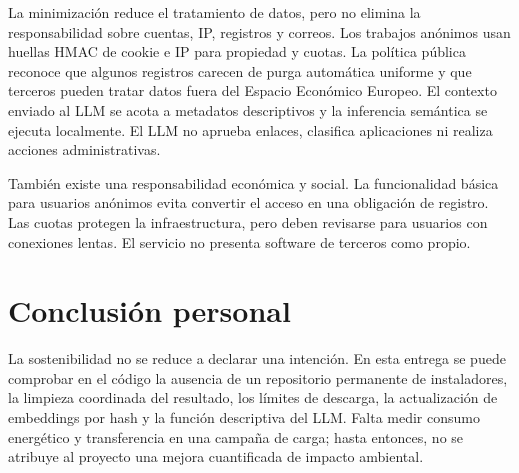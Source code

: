 La minimización reduce el tratamiento de datos, pero no elimina la responsabilidad sobre cuentas, IP, registros y correos. Los trabajos anónimos usan huellas HMAC de cookie e IP para propiedad y cuotas. La política pública reconoce que algunos registros carecen de purga automática uniforme y que terceros pueden tratar datos fuera del Espacio Económico Europeo. El contexto enviado al LLM se acota a metadatos descriptivos y la inferencia semántica se ejecuta localmente. El LLM no aprueba enlaces, clasifica aplicaciones ni realiza acciones administrativas.

También existe una responsabilidad económica y social. La funcionalidad básica para usuarios anónimos evita convertir el acceso en una obligación de registro. Las cuotas protegen la infraestructura, pero deben revisarse para usuarios con conexiones lentas. El servicio no presenta software de terceros como propio.

\section{Conclusión personal}

La sostenibilidad no se reduce a declarar una intención. En esta entrega se puede comprobar en el código la ausencia de un repositorio permanente de instaladores, la limpieza coordinada del resultado, los límites de descarga, la actualización de embeddings por hash y la función descriptiva del LLM. Falta medir consumo energético y transferencia en una campaña de carga; hasta entonces, no se atribuye al proyecto una mejora cuantificada de impacto ambiental.
